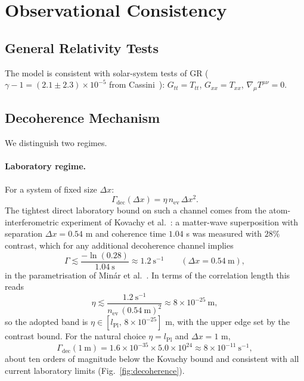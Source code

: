 \documentclass[11pt,a4paper]{article}
\begin{document}
\section{Observational Consistency}
\subsection{General Relativity Tests}
The model is consistent with solar-system tests of GR
($\gamma-1=(2.1\pm2.3)\times10^{-5}$ from Cassini~\cite{Will}):
$G_{tt}=T_{tt}$, $G_{xx}=T_{xx}$,
$\nabla_{\mu}T^{\mu\nu}=0$.

\subsection{Decoherence Mechanism}\label{sec:eta}
We distinguish two regimes.

\paragraph{Laboratory regime.}
For a system of fixed size $\Delta x$:
\begin{equation}
\Gamma_{\mathrm{dec}}(\Delta x)=\eta\, n_{\mathrm{ev}}\,\Delta x^{2}.
\label{eq:Gamma-dec}
\end{equation}
The tightest direct laboratory bound on such a channel comes from
the atom-interferometric experiment of Kovachy et
al.~\cite{KovachyNature}: a matter-wave superposition with
separation $\Delta x=0.54$ m and coherence time $1.04$ s was
measured with $28\%$ contrast, which for any additional
decoherence channel implies
\begin{equation}
\Gamma\lesssim\frac{-\ln(0.28)}{1.04\ \mathrm{s}}
\approx1.2\ \mathrm{s^{-1}}\qquad(\Delta x=0.54\ \mathrm{m}),
\label{eq:kovachy-bound}
\end{equation}
in the parametrisation of Min\'ar et al.~\cite{Minar}. In terms of
the correlation length this reads
\begin{equation}
\eta\lesssim\frac{1.2\ \mathrm{s^{-1}}}
 {n_{\mathrm{ev}}\,(0.54\ \mathrm{m})^{2}}
 \approx8\times10^{-25}\ \mathrm{m},
\label{eq:eta-bound}
\end{equation}
so the adopted band is $\eta\in[l_{\mathrm{Pl}},\,8\times10^{-25}]$ m,
with the upper edge set by the contrast bound. For the natural
choice $\eta=l_{\mathrm{Pl}}$ and $\Delta x=1$ m,
\begin{equation}
\Gamma_{\mathrm{dec}}(1\ \mathrm{m})=1.6\times10^{-35}\times
5.0\times10^{24}\approx8\times10^{-11}\ \mathrm{s^{-1}},
\label{eq:Gamma-dec-num}
\end{equation}
about ten orders of magnitude below the Kovachy bound and
consistent with all current laboratory limits
(Fig.~\ref{fig:decoherence}).
\end{document}

